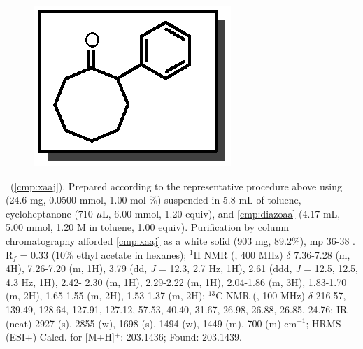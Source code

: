 \vspace{10pt}
\begin{figure}
  \vspace{-30pt}
  \begin{center}
    \includegraphics[scale=0.8]{chp_asymmetric/images/xaaj}
  \end{center}
  \vspace{-35pt}
\end{figure}\noindent \textbf{\CMPxaaj}\ (\ref{cmp:xaaj}). Prepared
according to the representative procedure above using  (24.6 mg,
0.0500 mmol, 1.00 mol \%) suspended in 5.8 mL of toluene, cycloheptanone (710
$\mu$L, 6.00 mmol, 1.20 equiv), and \ref{cmp:diazoaa} (4.17 mL, 5.00 mmol, 1.20
M in toluene, 1.00 equiv). Purification by column chromatography afforded
\ref{cmp:xaaj} as a white solid (903 mg, 89.2\%), mp 36-38 \degc. \\
R$_f$ = 0.33 (10\% ethyl acetate in hexanes); $^1$H NMR (, 400 MHz)
$\delta$ 7.36-7.28 (m, 4H), 7.26-7.20 (m, 1H), 3.79 (dd, \textit{J} = 12.3, 2.7
Hz, 1H), 2.61 (ddd, \textit{J} = 12.5, 12.5, 4.3 Hz, 1H), 2.42- 2.30 (m, 1H),
2.29-2.22 (m, 1H), 2.04-1.86 (m, 3H), 1.83-1.70 (m, 2H), 1.65-1.55 (m, 2H),
1.53-1.37 (m, 2H); $^{13}$C NMR (, 100 MHz) $\delta$ 216.57, 139.49,
128.64, 127.91, 127.12, 57.53, 40.40, 31.67, 26.98, 26.88, 26.85, 24.76; IR (neat) 2927
(s), 2855 (w), 1698 (s), 1494 (w), 1449 (m), 700 (m) cm$^{-1}$; HRMS (ESI+)
Calcd. for  [M+H]$^+$: 203.1436; Found: 203.1439.

